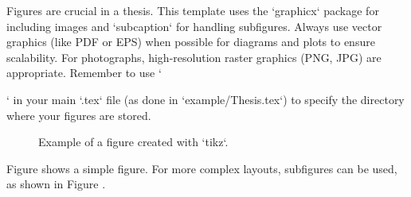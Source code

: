 Figures are crucial in a thesis. This template uses the `graphicx` package for including images and `subcaption` for handling subfigures.
Always use vector graphics (like PDF or EPS) when possible for diagrams and plots to ensure scalability. For photographs, high-resolution raster graphics (PNG, JPG) are appropriate.
Remember to use `\graphicspath{{Figures/}}` in your main `.tex` file (as done in `example/Thesis.tex`) to specify the directory where your figures are stored.

\begin{figure}[htbp]
    \centering
    \caption{Example of a figure created with `tikz`.}
    \label{fig:tikz_example}
\end{figure}

Figure  shows a simple figure. For more complex layouts, subfigures can be used, as shown in Figure .


